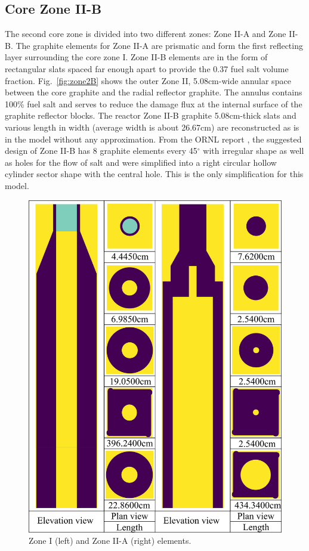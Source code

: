 \documentclass{anstrans}
\begin{document}
\subsection{Core Zone II-B}
The second core zone is divided into two different zones: Zone II-A and Zone II-B. The graphite elements for Zone II-A are prismatic and form the first reflecting layer surrounding the core zone I. Zone II-B elements are in the form of rectangular slats spaced far enough apart to provide the 0.37 fuel salt volume fraction. Fig.~\ref{fig:zone2B} shows the outer Zone II, 5.08cm-wide annular space between the core graphite and the radial reflector graphite. The annulus contains 100\% fuel salt and serves to reduce the damage flux at the internal surface of the graphite reflector blocks. The reactor Zone II-B graphite 5.08cm-thick slats and various length in width (average width is about 26.67cm) are reconstructed as is in the model without any approximation. From the ORNL report \cite{robertson_conceptual_1971}, the suggested design of Zone II-B has 8 graphite elements every 45$^\circ$ with irregular shape as well as holes for the flow of salt and were simplified into a right circular hollow cylinder sector shape with the central hole. This is the only simplification for this model.
\FloatBarrier
\begin{figure}[htp!] %
  \centering
  \includegraphics[width=\linewidth]{figure_2_4.png}
  \caption{Zone I (left) and Zone II-A (right) elements.}
  \label{fig:zone12A}
\end{figure}
\end{document}
